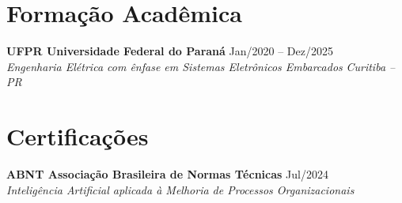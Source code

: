 \documentclass[a4paper,10pt]{article}
\newcommand{\entry}[4]{
    \noindent\textbf{#1} \hfill #2 \\
    \noindent\textit{#3} \hfill \textit{#4} \\
    \vspace{2pt}
}
\begin{document}
\section*{Formação Acadêmica}
\vspace{0.6em}

\entry{UFPR \textbullet{} Universidade Federal do Paraná}{\faCalendar \space Jan/2020 -- Dez/2025}{Engenharia Elétrica com ênfase em Sistemas Eletrônicos Embarcados}{Curitiba -- PR}

\section*{Certificações}
\vspace{0.6em}
\entry{ABNT \textbullet{} Associação Brasileira de Normas Técnicas}{\faCalendar \space Jul/2024}{Inteligência Artificial aplicada à Melhoria de Processos Organizacionais}{}
\end{document}
